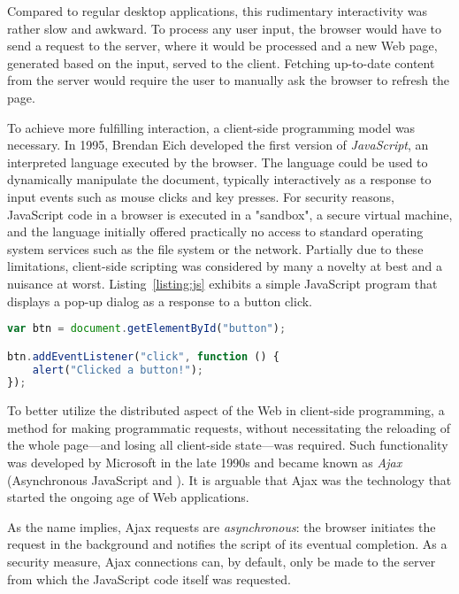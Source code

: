 Compared to regular desktop applications, this rudimentary interactivity was rather slow and awkward. To process any user input, the browser would have to send a  request to the server, where it would be processed and a new Web page, generated based on the input, served to the client. Fetching up-to-date content from the server would require the user to manually ask the browser to refresh the page.

To achieve more fulfilling interaction, a client-side programming model was necessary. In \num{1995}, Brendan Eich developed the first version of \emph{JavaScript}, an interpreted language executed by the browser. The language could be used to dynamically manipulate the document, typically interactively as a response to input events such as mouse clicks and key presses. For security reasons, JavaScript code in a browser is executed in a "sandbox", a secure virtual machine, and the language initially offered practically no access to standard operating system services such as the file system or the network. Partially due to these limitations, client-side scripting was considered by many a novelty at best and a nuisance at worst. Listing~\ref{listing:js} exhibits a simple JavaScript program that displays a pop-up dialog as a response to a button click.

\begin{code}
\begin{lstlisting}[language=JavaScript,caption=A small JavaScript program.\label{listing:js}]
var btn = document.getElementById("button");

btn.addEventListener("click", function () {
    alert("Clicked a button!");
});
\end{lstlisting}
\end{code}

To better utilize the distributed aspect of the Web in client-side programming, a method for making programmatic  requests, without necessitating the reloading of the whole page---and losing all client-side state---was required. Such functionality was developed by Microsoft in the late \num{1990s} and became known as \emph{Ajax} (Asynchronous JavaScript and ). It is arguable that Ajax was the technology that started the ongoing age of Web applications.

As the name implies, Ajax requests are \emph{asynchronous}: the browser initiates the request in the background and notifies the script of its eventual completion. As a security measure, Ajax connections can, by default, only be made to the server from which the JavaScript code itself was requested.

